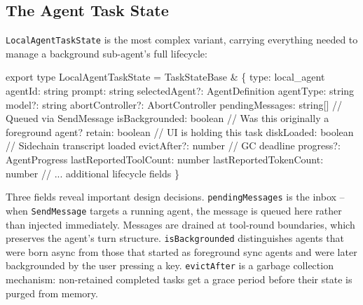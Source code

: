 \documentclass[
  english,
  11pt,
  letterpaper,
]{book}
\newenvironment{Shaded}{\begin{snugshade}}{\end{snugshade}}
\newcommand{\CommentTok}[1]{\textcolor[rgb]{0.37,0.37,0.37}{#1}}
\newcommand{\DataTypeTok}[1]{\textcolor[rgb]{0.68,0.00,0.00}{#1}}
\newcommand{\ImportTok}[1]{\textcolor[rgb]{0.00,0.46,0.62}{#1}}
\newcommand{\NormalTok}[1]{\textcolor[rgb]{0.00,0.23,0.31}{#1}}
\newcommand{\OperatorTok}[1]{\textcolor[rgb]{0.37,0.37,0.37}{#1}}
\newcommand{\StringTok}[1]{\textcolor[rgb]{0.13,0.47,0.30}{#1}}
\begin{document}
\subsection{The Agent Task State}\label{the-agent-task-state}

\texttt{LocalAgentTaskState} is the most complex variant, carrying
everything needed to manage a background sub-agent's full lifecycle:

\begin{Shaded}
\begin{Highlighting}[]
\ImportTok{export type}\NormalTok{ LocalAgentTaskState }\OperatorTok{=}\NormalTok{ TaskStateBase }\OperatorTok{\&}\NormalTok{ \{}
\NormalTok{  type}\OperatorTok{:} \StringTok{\textquotesingle{}local\_agent\textquotesingle{}}
\NormalTok{  agentId}\OperatorTok{:} \DataTypeTok{string}
\NormalTok{  prompt}\OperatorTok{:} \DataTypeTok{string}
\NormalTok{  selectedAgent}\OperatorTok{?:}\NormalTok{ AgentDefinition}
\NormalTok{  agentType}\OperatorTok{:} \DataTypeTok{string}
\NormalTok{  model}\OperatorTok{?:} \DataTypeTok{string}
\NormalTok{  abortController}\OperatorTok{?:}\NormalTok{ AbortController}
\NormalTok{  pendingMessages}\OperatorTok{:} \DataTypeTok{string}\NormalTok{[]       }\CommentTok{// Queued via SendMessage}
\NormalTok{  isBackgrounded}\OperatorTok{:} \DataTypeTok{boolean}         \CommentTok{// Was this originally a foreground agent?}
\NormalTok{  retain}\OperatorTok{:} \DataTypeTok{boolean}                 \CommentTok{// UI is holding this task}
\NormalTok{  diskLoaded}\OperatorTok{:} \DataTypeTok{boolean}             \CommentTok{// Sidechain transcript loaded}
\NormalTok{  evictAfter}\OperatorTok{?:} \DataTypeTok{number}             \CommentTok{// GC deadline}
\NormalTok{  progress}\OperatorTok{?:}\NormalTok{ AgentProgress}
\NormalTok{  lastReportedToolCount}\OperatorTok{:} \DataTypeTok{number}
\NormalTok{  lastReportedTokenCount}\OperatorTok{:} \DataTypeTok{number}
  \CommentTok{// ... additional lifecycle fields}
\NormalTok{\}}
\end{Highlighting}
\end{Shaded}

Three fields reveal important design decisions. \texttt{pendingMessages}
is the inbox -- when \texttt{SendMessage} targets a running agent, the
message is queued here rather than injected immediately. Messages are
drained at tool-round boundaries, which preserves the agent's turn
structure. \texttt{isBackgrounded} distinguishes agents that were born
async from those that started as foreground sync agents and were later
backgrounded by the user pressing a key. \texttt{evictAfter} is a
garbage collection mechanism: non-retained completed tasks get a grace
period before their state is purged from memory.
\end{document}
